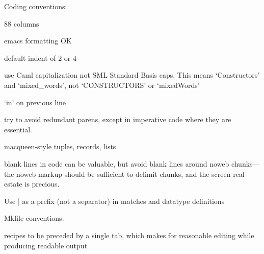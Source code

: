 Coding conventions:

  88 columns

  emacs formatting OK

  default indent of 2 or 4

  use Caml capitalization not SML Standard Basis caps.
  This means `Constructors' and `mixed_words', not `CONSTRUCTORS' or `mixedWords'

  `in' on previous line

  try to avoid redundant parens, except in imperative code where they
  are essential.

  macqueen-style tuples, records, lists

  blank lines in code can be valuable, but avoid blank lines around
  noweb chunks---the noweb markup should be sufficient to delimit
  chunks, and the screen real-estate is precious.

  Use | as a prefix (not a separator) in matches and datatype definitions

Mkfile conventions:

  recipes to be preceded by a single tab, which makes for reasonable
  editing while producing readable output

